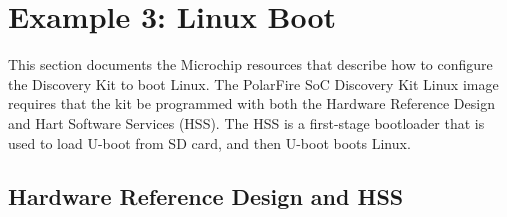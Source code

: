 \section{Example 3: Linux Boot}
\label{sec:linux_boot}

This section documents the Microchip resources that describe how to configure
the Discovery Kit to boot Linux.
%
The PolarFire SoC Discovery Kit Linux image requires that the kit be programmed
with both the Hardware Reference Design and Hart Software Services (HSS).
The HSS is a first-stage bootloader that is used to load U-boot from SD card,
and then U-boot boots Linux.

\subsection{Hardware Reference Design and HSS}


